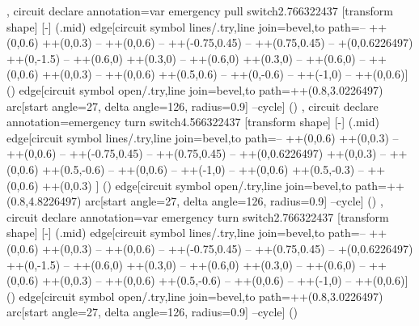 {{  },
  circuit declare annotation={var emergency pull switch}{2.766322437\tikzcircuitssizeunit}
  {
    [transform shape]
    [-]
    (\tikzlastnode.mid) edge[circuit symbol lines/.try,line join=bevel,to path={-- ++(0,0.6\tikzcircuitssizeunit) ++(0,0.3\tikzcircuitssizeunit) -- ++(0,0.6\tikzcircuitssizeunit) -- ++(-0.75\tikzcircuitssizeunit,0.45\tikzcircuitssizeunit)  -- ++(0.75\tikzcircuitssizeunit,0.45\tikzcircuitssizeunit) -- +(0,0.6226497\tikzcircuitssizeunit) ++(0,-1.5\tikzcircuitssizeunit) -- ++(0.6\tikzcircuitssizeunit,0) ++(0.3\tikzcircuitssizeunit,0) -- ++(0.6\tikzcircuitssizeunit,0) ++(0.3\tikzcircuitssizeunit,0) -- ++(0.6\tikzcircuitssizeunit,0) -- ++(0,0.6\tikzcircuitssizeunit)  ++(0,0.3\tikzcircuitssizeunit) -- ++(0,0.6\tikzcircuitssizeunit) ++(0.5\tikzcircuitssizeunit,0.6\tikzcircuitssizeunit) -- ++(0,-0.6\tikzcircuitssizeunit) -- ++(-1\tikzcircuitssizeunit,0) -- ++(0,0.6\tikzcircuitssizeunit)}] () edge[circuit symbol open/.try,line join=bevel,to path={++(0.8\tikzcircuitssizeunit,3.0226497\tikzcircuitssizeunit) arc[start angle=27, delta angle=126, radius=0.9\tikzcircuitssizeunit] --cycle}] ()
  },
  circuit declare annotation={emergency turn switch}{4.566322437\tikzcircuitssizeunit}
  {
    [transform shape]
    [-]
    (\tikzlastnode.mid) edge[circuit symbol lines/.try,line join=bevel,to path={-- ++(0,0.6\tikzcircuitssizeunit) ++(0,0.3\tikzcircuitssizeunit) -- ++(0,0.6\tikzcircuitssizeunit) -- ++(-0.75\tikzcircuitssizeunit,0.45\tikzcircuitssizeunit)  -- ++(0.75\tikzcircuitssizeunit,0.45\tikzcircuitssizeunit) -- ++(0,0.6226497\tikzcircuitssizeunit) ++(0,0.3\tikzcircuitssizeunit) -- ++(0,0.6\tikzcircuitssizeunit) ++(0.5\tikzcircuitssizeunit,-0.6\tikzcircuitssizeunit) -- ++(0,0.6\tikzcircuitssizeunit) -- ++(-1\tikzcircuitssizeunit,0) -- ++(0,0.6\tikzcircuitssizeunit) ++(0.5\tikzcircuitssizeunit,-0.3\tikzcircuitssizeunit) -- ++(0,0.6\tikzcircuitssizeunit) ++(0,0.3\tikzcircuitssizeunit) } ] () edge[circuit symbol open/.try,line join=bevel,to path={++(0.8\tikzcircuitssizeunit,4.8226497\tikzcircuitssizeunit) arc[start angle=27, delta angle=126, radius=0.9\tikzcircuitssizeunit] --cycle}] ()
  },
  circuit declare annotation={var emergency turn switch}{2.766322437\tikzcircuitssizeunit}
  {
    [transform shape]
    [-]
    (\tikzlastnode.mid) edge[circuit symbol lines/.try,line join=bevel,to path={-- ++(0,0.6\tikzcircuitssizeunit) ++(0,0.3\tikzcircuitssizeunit) -- ++(0,0.6\tikzcircuitssizeunit) -- ++(-0.75\tikzcircuitssizeunit,0.45\tikzcircuitssizeunit)  -- ++(0.75\tikzcircuitssizeunit,0.45\tikzcircuitssizeunit) -- +(0,0.6226497\tikzcircuitssizeunit) ++(0,-1.5\tikzcircuitssizeunit) -- ++(0.6\tikzcircuitssizeunit,0) ++(0.3\tikzcircuitssizeunit,0) -- ++(0.6\tikzcircuitssizeunit,0) ++(0.3\tikzcircuitssizeunit,0) -- ++(0.6\tikzcircuitssizeunit,0) -- ++(0,0.6\tikzcircuitssizeunit)  ++(0,0.3\tikzcircuitssizeunit) -- ++(0,0.6\tikzcircuitssizeunit) ++(0.5\tikzcircuitssizeunit,-0.6\tikzcircuitssizeunit) -- ++(0,0.6\tikzcircuitssizeunit) -- ++(-1\tikzcircuitssizeunit,0) -- ++(0,0.6\tikzcircuitssizeunit)}] () edge[circuit symbol open/.try,line join=bevel,to path={++(0.8\tikzcircuitssizeunit,3.0226497\tikzcircuitssizeunit) arc[start angle=27, delta angle=126, radius=0.9\tikzcircuitssizeunit] --cycle}] ()
}}
